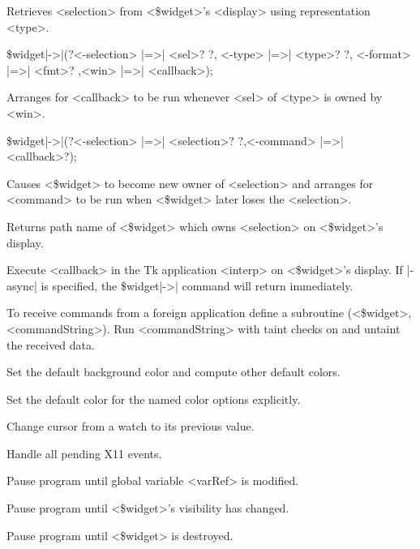 \begin{enum}{1cm}
Retrieves <selection> from <\$widget>'s <display> using representation <type>.

\item[\$widget|->|\kwd{selectionHandle}(?<-selection> |=>| <sel>? ?, <-type> |=>| <type>?]
  ?, <-format> |=>| <fmt>? ,<win> |=>| <callback>);\strut\newline
{}
Arranges for <callback> to be run whenever <sel> of <type> is owned by <win>.

\item[\$widget|->|\kwd{selectionOwn}(?<-selection> |=>| <selection>?]
  ?,<-command> |=>| <callback>?);\strut\newline
{}
Causes <\$widget> to become new owner of <selection> and arranges for
<command> to be run when <\$widget> later loses the <selection>.

Returns path name of <\$widget> which owns <selection> on <\$widget>'s display.

Execute <callback> in the Tk application <interp> on <\$widget>'s display.
If |-async| is specified, the \$widget|->| command will return immediately.

To receive commands from a foreign application define a subroutine
(<\$widget>, <commandString>). Run <commandString> with
taint checks on and untaint the received data.

Set the default background color and compute other default colors.

Set the default color for the named color options explicitly.

Change cursor from a watch to its previous value.

Handle all pending X11 events.

Pause program until global variable <varRef> is modified.

Pause program until <\$widget>'s visibility has changed.

Pause program until <\$widget> is destroyed.
 
\end{enum}
